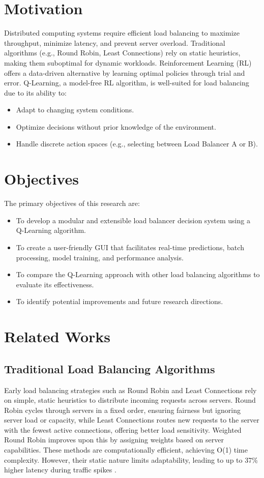 \documentclass[runningheads]{llncs}
\begin{document}
\section{Motivation}\label{motivation}
Distributed computing systems require efficient load balancing to maximize throughput, minimize latency, and prevent server overload. Traditional algorithms (e.g., Round Robin, Least Connections) rely on static heuristics, making them suboptimal for dynamic workloads. Reinforcement Learning (RL) offers a data-driven alternative by learning optimal policies through trial and error. Q-Learning, a model-free RL algorithm, is well-suited for load balancing due to its ability to:
\begin{itemize}
    \item Adapt to changing system conditions.
    \item Optimize decisions without prior knowledge of the environment.
    \item Handle discrete action spaces (e.g., selecting between Load Balancer A or B).
\end{itemize}

\section{Objectives}\label{objectives}
The primary objectives of this research are:
\begin{itemize}
    \item To develop a modular and extensible load balancer decision system using a Q-Learning algorithm.
    \item To create a user-friendly GUI that facilitates real-time predictions, batch processing, model training, and performance analysis.
    \item To compare the Q-Learning approach with other load balancing algorithms to evaluate its effectiveness.
    \item To identify potential improvements and future research directions.
\end{itemize}

\section{Related Works}\label{related-works}

\subsection{Traditional Load Balancing Algorithms}\label{traditional-load-balancing-algorithms}
Early load balancing strategies such as Round Robin and Least Connections rely on simple, static heuristics to distribute incoming requests across servers. Round Robin cycles through servers in a fixed order, ensuring fairness but ignoring server load or capacity, while Least Connections routes new requests to the server with the fewest active connections, offering better load sensitivity. Weighted Round Robin improves upon this by assigning weights based on server capabilities. These methods are computationally efficient, achieving O(1) time complexity. However, their static nature limits adaptability, leading to up to 37\% higher latency during traffic spikes \cite{amazon2020}.
\end{document}
